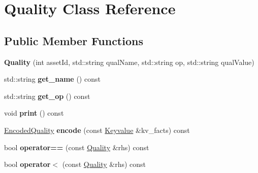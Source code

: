 \hypertarget{class_quality}{}\section{Quality Class Reference}
\label{class_quality}
\subsection*{Public Member Functions}
\begin{DoxyCompactItemize}
\item 
\mbox{\label{class_quality_aa432c0b241ca875576cc821f6a36f3ee}} 
{\bfseries Quality} (int asset\+Id, std\+::string qual\+Name, std\+::string op, std\+::string qual\+Value)
\item 
\mbox{\label{class_quality_a28dfd360831d210cd6c36885837036a0}} 
std\+::string {\bfseries get\+\_\+name} () const
\item 
\mbox{\label{class_quality_a97187cfcac228c0cbbfdbc88ae28a6e7}} 
std\+::string {\bfseries get\+\_\+op} () const
\item 
\mbox{\label{class_quality_ae1107bd1cefb13f3dd7d51e310ed784d}} 
void {\bfseries print} () const
\item 
\mbox{\label{class_quality_a9e2bdc66c0189feb5600fb4122bb99cf}} 
\mbox{\hyperlink{union_encoded_quality}{Encoded\+Quality}} {\bfseries encode} (const \mbox{\hyperlink{class_keyvalue}{Keyvalue}} \&kv\+\_\+facts) const
\item 
\mbox{\label{class_quality_a44c77630be5e4c6c6c1ed0beb6f9466a}} 
bool {\bfseries operator==} (const \mbox{\hyperlink{class_quality}{Quality}} \&rhs) const
\item 
\mbox{\label{class_quality_a4b5934a7aa94a2423cd3ec2883a96d20}} 
bool {\bfseries operator$<$} (const \mbox{\hyperlink{class_quality}{Quality}} \&rhs) const
\end{DoxyCompactItemize}
